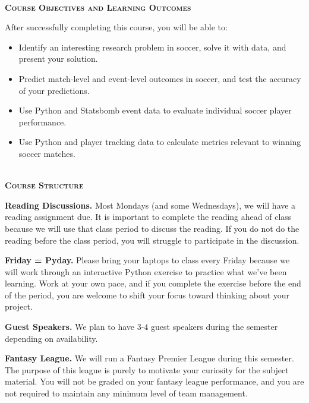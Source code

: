 \documentclass[11pt]{article}
\begin{document}
~\\
\textbf{\textsc{Course Objectives and Learning Outcomes}}
\begin{adjustwidth}{1cm}{0cm}
  After successfully completing this course, you will be able to:
  \begin{itemize}
    \item Identify an interesting research problem in soccer, solve it with data, and present your solution.
    \item Predict match-level and event-level outcomes in soccer, and test the accuracy of your predictions.
    \item Use Python and Statsbomb event data to evaluate individual soccer player performance.
    \item Use Python and player tracking data to calculate metrics relevant to winning soccer matches.
  \end{itemize}
\end{adjustwidth}

~\\
\textbf{\textsc{Course Structure}}
\begin{adjustwidth}{1cm}{0cm}
  \textbf{Reading Discussions.} Most Mondays (and some Wednesdays), we will have a reading assignment due. It is important to complete the reading ahead of class because we will use that class period to discuss the reading. If you do not do the reading before the class period, you will struggle to participate in the discussion.

  \textbf{Friday = Pyday.} Please bring your laptops to class every Friday because we will work through an interactive Python exercise to practice what we've been learning. Work at your own pace, and if you complete the exercise before the end of the period, you are welcome to shift your focus toward thinking about your project.

  \textbf{Guest Speakers.} We plan to have $3$-$4$ guest speakers during the semester depending on availability.

	\textbf{Fantasy League.} We will run a Fantasy Premier League during this semester. The purpose of this league is purely to motivate your curiosity for the subject material. You will not be graded on your fantasy league performance, and you are not required to maintain any minimum level of team management.
\end{adjustwidth}
\end{document}
